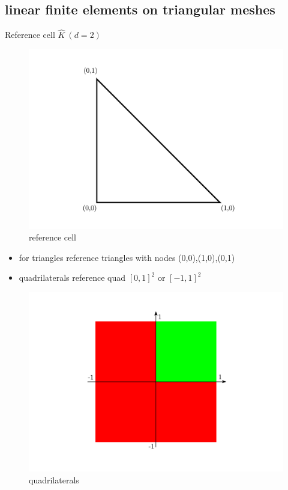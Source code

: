 \documentclass[english]{article}
\theoremstyle{definition}
\theoremstyle{remark}
\begin{document}
\subsection{linear finite elements on triangular meshes}
Reference cell $\hat K \ (d=2)$
\begin{figure}[H]
  \begin{center}
    \includegraphics[width=\textwidth]{figs/referenceCell.pdf}
  \end{center}
  \caption{reference cell}
  \label{reference-cell-figure}
\end{figure}
\begin{itemize}
\item for triangles reference triangles with nodes (0,0),(1,0),(0,1)
\item quadrilaterals reference quad $[0,1]^2$ or $[-1,1]^2$
\end{itemize}
\begin{figure}[H]
  \begin{center}
    \includegraphics[width=\textwidth]{figs/quadrilaterals.pdf}
  \end{center}
  \caption{quadrilaterals}
  \label{quadrilaterals-figure}
\end{figure}
\end{document}
